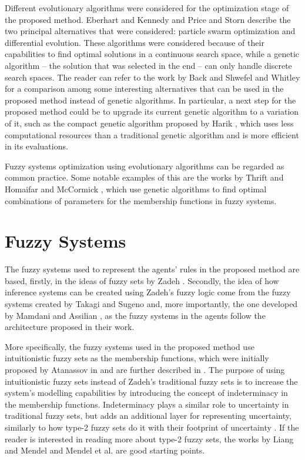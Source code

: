 Different evolutionary algorithms were considered for the optimization stage of
the proposed method. Eberhart and Kennedy \cite{Eberhart2002} and Price and
Storn \cite{Price1997} describe the two principal alternatives that were
considered: particle swarm optimization and differential evolution. These
algorithms were considered because of their capabilities to find optimal
solutions in a continuous search space, while a genetic algorithm -- the
solution that was selected in the end -- can only handle discrete search
spaces. The reader can refer to the work by Back and Shwefel \cite{Back2008} and
Whitley \cite{Whitley1994} for a comparison among some interesting alternatives
that can be used in the proposed method instead of genetic algorithms. In
particular, a next step for the proposed method could be to upgrade its current
genetic algorithm to a variation of it, such as the compact genetic algorithm
proposed by Harik \cite{Harik1999}, which uses less computational resources than
a traditional genetic algorithm and is more efficient in its evaluations.

Fuzzy systems optimization using evolutionary algorithms can be regarded as
common practice. Some notable examples of this are the works by Thrift
\cite{Thrift1991} and Homaifar and McCormick \cite{Homaifar1995}, which use
genetic algorithms to find optimal combinations of parameters for the membership
functions in fuzzy systems.

\section{Fuzzy Systems}
\label{section:fuzzy-systems}

The fuzzy systems used to represent the agents' rules in the proposed method are
based, firstly, in the ideas of fuzzy sets by Zadeh \cite{Zadeh1965}. Secondly,
the idea of how inference systems can be created using Zadeh's fuzzy logic come
from the fuzzy systems created by Takagi and Sugeno \cite{Takagi1985} and, more
importantly, the one developed by Mamdani and Assilian \cite{Mamdani1975}, as
the fuzzy systems in the agents follow the architecture proposed in their work.

More specifically, the fuzzy systems used in the proposed method use
intuitionistic fuzzy sets as the membership functions, which were initially
proposed by Atanassov in \cite{Atanassov1986} and are further described in
\cite{Atanassov2003}. The purpose of using intuitionistic fuzzy sets instead of
Zadeh's traditional fuzzy sets is to increase the system's modelling
capabilities by introducing the concept of indeterminacy in the membership
functions. Indeterminacy plays a similar role to uncertainty in traditional
fuzzy sets, but adds an additional layer for representing uncertainty, similarly
to how type-2 fuzzy sets do it with their footprint of uncertainty
\cite{Mendel2002} \cite{Karnik2001}. If the reader is interested in reading more
about type-2 fuzzy sets, the works by Liang and Mendel \cite{Liang2000} and
Mendel et al. \cite{Mendel2006} are good starting points.

